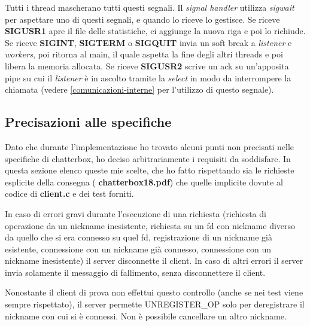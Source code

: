 \documentclass[a4paper]{article}
\theoremstyle{theorem}
\theoremstyle{remark}
\theoremstyle{definition}
\theoremstyle{corollary}
\theoremstyle{lemma}
\newcommand\file[1]{%
	\textbf{#1}}
\newcommand\codeName[1]{%
	\textit{#1}}
\begin{document}
Tutti i thread mascherano tutti questi segnali. Il \codeName{signal handler} utilizza \codeName{sigwait} per aspettare uno di questi segnali, e quando lo riceve lo gestisce. Se riceve \textbf{SIGUSR1} apre il file delle statistiche, ci aggiunge la nuova riga e poi lo richiude. Se riceve \textbf{SIGINT}, \textbf{SIGTERM} o \textbf{SIGQUIT} invia un soft break a \codeName{listener} e \codeName{workers}, poi ritorna al main, il quale aspetta la fine degli altri threads e poi libera la memoria allocata. Se riceve \textbf{SIGUSR2} scrive un ack su un'apposita pipe su cui il \codeName{listener} è in ascolto tramite la \codeName{select} in modo da interrompere la chiamata (vedere \autoref{comunicazioni-interne} per l'utilizzo di questo segnale).

\subsection{Precisazioni alle specifiche}
Dato che durante l'implementazione ho trovato alcuni punti non precisati nelle specifiche di chatterbox, ho deciso arbitrariamente i requisiti da soddisfare. In questa sezione elenco queste mie scelte, che ho fatto rispettando sia le richieste esplicite della consegna (\file{chatterbox18.pdf}) che quelle implicite dovute al codice di \file{client.c} e dei test forniti.

In caso di errori gravi durante l'esecuzione di una richiesta (richiesta di operazione da un nickname inesistente, richiesta su un fd con nickname diverso da quello che si era connesso su quel fd, registrazione di un nickname già esistente, connessione con un nickname già connesso, connessione con un nickname inesistente) il server disconnette il client. In caso di altri errori il server invia solamente il messaggio di fallimento, senza disconnettere il client.

Nonostante il client di prova non effettui questo controllo (anche se nei test viene sempre rispettato), il server permette UNREGISTER\_OP solo per deregistrare il nickname con cui si è connessi. Non è possibile cancellare un altro nickname.
\end{document}
